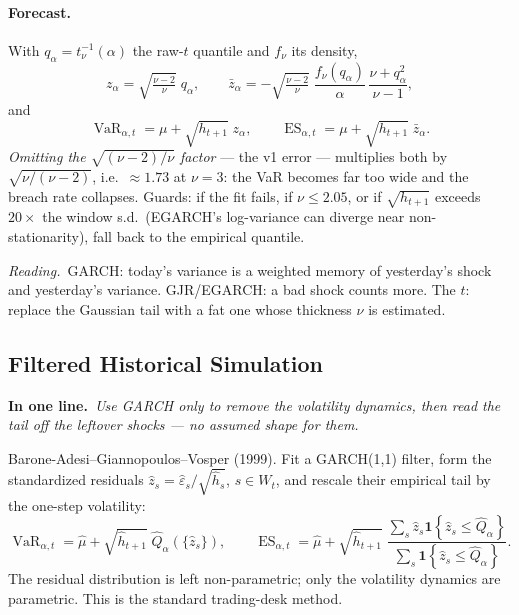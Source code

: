 \documentclass[11pt,a4paper]{article}
\newcommand{\Ind}[1]{\mathbf{1}\!\left\{#1\right\}}
\newcommand{\VaR}{\operatorname{VaR}}
\newcommand{\ES}{\operatorname{ES}}
\newcommand{\intuition}[1]{\par\smallskip\noindent\textit{Reading.}\ #1\par\smallskip}
\newcommand{\inbrief}[1]{\par\noindent\textbf{In one line.}\ \textit{#1}\par\smallskip}
\begin{document}
\paragraph{Forecast.} With $q_\alpha = t_\nu^{-1}(\alpha)$ the raw-$t$ quantile
and $f_\nu$ its density,
\begin{equation}
  z_\alpha = \sqrt{\tfrac{\nu-2}{\nu}}\;q_\alpha,
  \qquad
  \bar z_\alpha
    = -\sqrt{\tfrac{\nu-2}{\nu}}\;\frac{f_\nu(q_\alpha)}{\alpha}\,
      \frac{\nu + q_\alpha^2}{\nu-1},
\end{equation}
and
\begin{equation}
  \VaR_{\alpha,t} = \mu + \sqrt{h_{t+1}}\;z_\alpha,
  \qquad
  \ES_{\alpha,t} = \mu + \sqrt{h_{t+1}}\;\bar z_\alpha .
\end{equation}
\emph{Omitting the $\sqrt{(\nu-2)/\nu}$ factor} --- the v1 error --- multiplies
both by $\sqrt{\nu/(\nu-2)}$, i.e.\ $\approx1.73$ at $\nu=3$: the VaR becomes far
too wide and the breach rate collapses. Guards: if the fit fails, if
$\nu\le2.05$, or if $\sqrt{h_{t+1}}$ exceeds $20\times$ the window s.d.\
(EGARCH's log-variance can diverge near non-stationarity), fall back to the
empirical quantile.

\intuition{GARCH: today's variance is a weighted memory of yesterday's shock and
yesterday's variance. GJR/EGARCH: a bad shock counts more. The $t$: replace the
Gaussian tail with a fat one whose thickness $\nu$ is estimated.}

\subsection{Filtered Historical Simulation}

\inbrief{Use GARCH only to remove the volatility dynamics, then read the tail
off the leftover shocks --- no assumed shape for them.}

Barone-Adesi--Giannopoulos--Vosper (1999). Fit a GARCH(1,1) filter, form the
standardized residuals $\hat z_s = \hat\varepsilon_s/\sqrt{\hat h_s}$,
$s\in W_t$, and rescale their empirical tail by the one-step volatility:
\begin{equation}
  \VaR_{\alpha,t} = \hat\mu + \sqrt{\hat h_{t+1}}\;\widehat Q_\alpha(\{\hat z_s\}),
  \qquad
  \ES_{\alpha,t} = \hat\mu + \sqrt{\hat h_{t+1}}\;
     \frac{\sum_s \hat z_s\Ind{\hat z_s\le\widehat Q_\alpha}}
          {\sum_s \Ind{\hat z_s\le\widehat Q_\alpha}} .
\end{equation}
The residual distribution is left non-parametric; only the volatility dynamics
are parametric. This is the standard trading-desk method.
\end{document}
